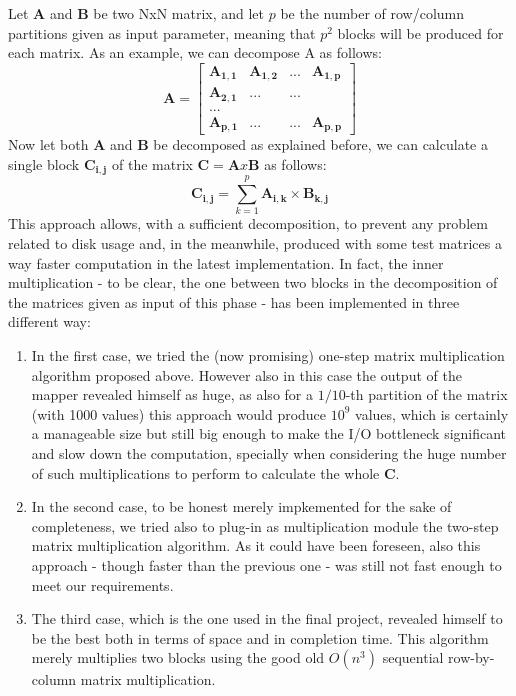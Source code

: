 Let $\mathbf{A}$ and $\mathbf{B}$ be two NxN matrix, and let $p$ be the number of row/column partitions given
as input parameter, meaning that $p^2$ blocks will be produced for each matrix. As an example, we can decompose
A as follows:
$$
\mathbf{A} =
\begin{bmatrix}
    \mathbf{A_{1,1}} & \mathbf{A_{1,2}} & ... & \mathbf{A_{1,p}} \\
    \mathbf{A_{2,1}} & ... & ... \\
    ... \\
    \mathbf{A_{p,1}} & ... & ... & \mathbf{A_{p,p}}
\end{bmatrix}
$$
Now let both $\mathbf{A}$ and $\mathbf{B}$ be decomposed as explained before, we can calculate a single block $\mathbf{C_{i,j}}$
of the matrix $\mathbf{C} = \mathbf{A} x \mathbf{B}$ as follows:
$$
    \mathbf{C_{i,j}} = \sum_{k=1}^{p} \mathbf{A_{i,k}} \times \mathbf{B_{k, j}}
$$
This approach allows, with a sufficient decomposition, to prevent any problem related to disk usage and, in the meanwhile,
produced with some test matrices a way faster computation in the latest implementation.
In fact, the inner multiplication - to be clear, the one between two blocks in the decomposition of the matrices given
as input of this phase - has been implemented in three different way:
\begin{enumerate}
\item In the first case, we tried the (now promising) one-step matrix multiplication algorithm proposed above. However also in this case the output of the mapper revealed himself as huge, as also for a $1/10$-th partition of the matrix (with 1000 values) this approach would produce $10^9$ values, which is certainly a manageable size but still big enough to make the I/O bottleneck significant and slow down the computation, specially when considering the huge number of such multiplications to perform to calculate the whole $\mathbf{C}.$
\item In the second case, to be honest merely impkemented for the sake of completeness, we tried also to plug-in as multiplication module the two-step matrix multiplication algorithm. As it could have been foreseen, also this approach - though faster than the previous one - was still not fast enough to meet our requirements.
\item The third case, which is the one used in the final project, revealed himself to be the best both in terms of space and in completion time. This algorithm merely multiplies two blocks using the good old $O(n^3)$ sequential row-by-column matrix multiplication.
\end{enumerate}

